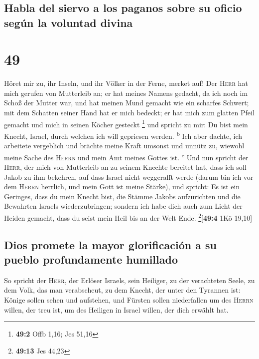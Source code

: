 \hypertarget{habla-del-siervo-a-los-paganos-sobre-su-oficio-seguxfan-la-voluntad-divina}{%
\subsection{Habla del siervo a los paganos sobre su oficio según la
voluntad
divina}\label{habla-del-siervo-a-los-paganos-sobre-su-oficio-seguxfan-la-voluntad-divina}}

\hypertarget{section-48}{%
\section{49}\label{section-48}}

 Höret mir zu, ihr Inseln, und ihr Völker in der Ferne,
merket auf! Der \textsc{Herr} hat mich gerufen von Mutterleib an; er hat
meines Namens gedacht, da ich noch im Schoß der Mutter war,
 und hat meinen Mund gemacht wie ein scharfes Schwert; mit
dem Schatten seiner Hand hat er mich bedeckt; er hat mich zum glatten
Pfeil gemacht und mich in seinen Köcher gesteckt \footnote{\textbf{49:2}
  Offb 1,16; Jes 51,16}  und spricht zu mir: Du bist mein
Knecht, Israel, durch welchen ich will gepriesen werden.
\textsuperscript{b}  Ich aber dachte, ich arbeitete
vergeblich und brächte meine Kraft umsonst und unnütz zu, wiewohl meine
Sache des \textsc{Herrn} und mein Amt meines Gottes ist.
\textsuperscript{c}  Und nun spricht der \textsc{Herr},
der mich von Mutterleib an zu seinem Knechte bereitet hat, dass ich soll
Jakob zu ihm bekehren, auf dass Israel nicht weggerafft werde (darum bin
ich vor dem \textsc{Herrn} herrlich, und mein Gott ist meine Stärke),
 und spricht: Es ist ein Geringes, dass du mein Knecht
bist, die Stämme Jakobs aufzurichten und die Bewahrten Israels
wiederzubringen; sondern ich habe dich auch zum Licht der Heiden
gemacht, dass du seist mein Heil bis an der Welt Ende.
\footnote{\textbf{49:13} Jes 44,23}{[}\textbf{49:4} 1Kö 19,10{]}

\hypertarget{dios-promete-la-mayor-glorificaciuxf3n-a-su-pueblo-profundamente-humillado}{%
\subsection{Dios promete la mayor glorificación a su pueblo
profundamente
humillado}\label{dios-promete-la-mayor-glorificaciuxf3n-a-su-pueblo-profundamente-humillado}}

 So spricht der \textsc{Herr}, der Erlöser Israels, sein
Heiliger, zu der verachteten Seele, zu dem Volk, das man verabscheut, zu
dem Knecht, der unter den Tyrannen ist: Könige sollen sehen und
aufstehen, und Fürsten sollen niederfallen um des \textsc{Herrn} willen,
der treu ist, um des Heiligen in Israel willen, der dich erwählt hat.


